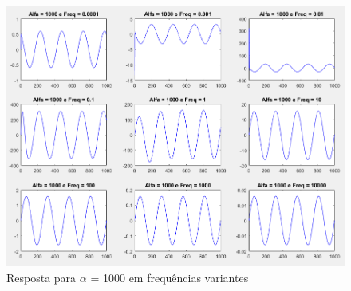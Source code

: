 \documentclass[a4paper, 12pt]{article}
\begin{document}
			\begin{figure}[!ht]
				\centering
				\includegraphics[scale=0.49]{img/3k_alfa7.png}
				\caption{Resposta para $\alpha$ = 1000 em frequências variantes}
			\end{figure}
			\clearpage
\end{document}

